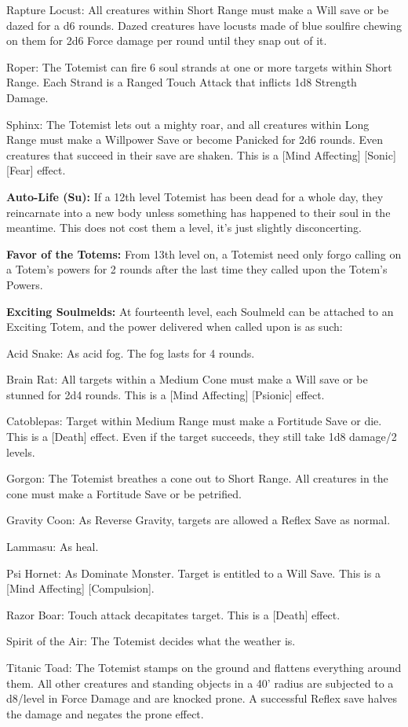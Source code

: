 \begin{itemize*}
\item Rapture Locust: All creatures within Short Range must make a Will save or be dazed for a d6 rounds. Dazed creatures have locusts made of blue soulfire chewing on them for 2d6 Force damage per round until they snap out of it. 
\item Roper: The Totemist can fire 6 soul strands at one or more targets within Short Range. Each Strand is a Ranged Touch Attack that inflicts 1d8 Strength Damage. 
\item Sphinx: The Totemist lets out a mighty roar, and all creatures within Long Range must make a Willpower Save or become Panicked for 2d6 rounds. Even creatures that succeed in their save are shaken. This is a [Mind Affecting] [Sonic] [Fear] effect. 
\end{itemize*}

\textbf{Auto-Life (Su):} If a 12th level Totemist has been dead for a whole day, they reincarnate into a new body unless something has happened to their soul in the meantime. This does not cost them a level, it's just slightly disconcerting. 

\textbf{Favor of the Totems:} From 13th level on, a Totemist need only forgo calling on a Totem's powers for 2 rounds after the last time they called upon the Totem's Powers. 

\textbf{Exciting Soulmelds:} At fourteenth level, each Soulmeld can be attached to an Exciting Totem, and the power delivered when called upon is as such: 
\begin{itemize*}
\item Acid Snake: As acid fog. The fog lasts for 4 rounds. 
\item Brain Rat: All targets within a Medium Cone must make a Will save or be stunned for 2d4 rounds. This is a [Mind Affecting] [Psionic] effect. 
\item Catoblepas: Target within Medium Range must make a Fortitude Save or die. This is a [Death] effect. Even if the target succeeds, they still take 1d8 damage/2 levels. 
\item Gorgon: The Totemist breathes a cone out to Short Range. All creatures in the cone must make a Fortitude Save or be petrified. 
\item Gravity Coon: As Reverse Gravity, targets are allowed a Reflex Save as normal. 
\item Lammasu: As heal. 
\item Psi Hornet: As Dominate Monster. Target is entitled to a Will Save. This is a [Mind Affecting] [Compulsion]. 
\item Razor Boar: Touch attack decapitates target. This is a [Death] effect. 
\item Spirit of the Air: The Totemist decides what the weather is. 
\item Titanic Toad: The Totemist stamps on the ground and flattens everything around them. All other creatures and standing objects in a 40' radius are subjected to a d8/level in Force Damage and are knocked prone. A successful Reflex save halves the damage and negates the prone effect. 
\end{itemize*}

